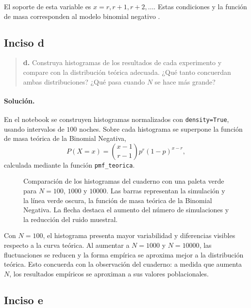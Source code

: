\documentclass[11pt,a4paper]{article}
\begin{document}
El soporte de esta variable es $x=r,r+1,r+2,\ldots$. Estas condiciones y la función de masa corresponden al modelo binomial negativo \citep[sec.~3.5, p.~119]{devore2008}.

\subsection*{Inciso d}

\begin{quote}
\textbf{d.} Construya histogramas de los resultados de cada experimento y compare con la distribución teórica adecuada. ¿Qué tanto concuerdan ambas distribuciones? ¿Qué pasa cuando $N$ se hace más grande?
\end{quote}

\paragraph{Solución.}

En el notebook se construyen histogramas normalizados con \texttt{density=True}, usando intervalos de $100$ noches. Sobre cada histograma se superpone la función de masa teórica de la Binomial Negativa,
\[
    P(X=x)=\binom{x-1}{r-1}p^r(1-p)^{x-r},
\]
calculada mediante la función \texttt{pmf\_teorica}.

\begin{figure}[H]
    \centering
    
    \caption{Comparación de los histogramas del cuaderno con una paleta verde para $N=100$, $1000$ y $10000$. Las barras representan la simulación y la línea verde oscura, la función de masa teórica de la Binomial Negativa. La flecha destaca el aumento del número de simulaciones y la reducción del ruido muestral.}
    \label{fig:histogramas}
\end{figure}

Con $N=100$, el histograma presenta mayor variabilidad y diferencias visibles respecto a la curva teórica. Al aumentar a $N=1000$ y $N=10000$, las fluctuaciones se reducen y la forma empírica se aproxima mejor a la distribución teórica. Esto concuerda con la observación del cuaderno: a medida que aumenta $N$, los resultados empíricos se aproximan a sus valores poblacionales.



\subsection*{Inciso e}
\end{document}
